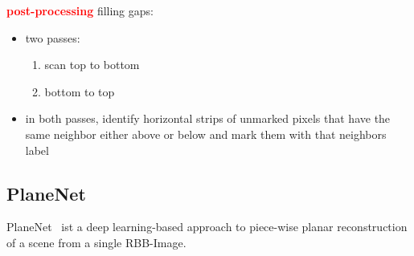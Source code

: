 \documentclass[main.tex]{subfiles}
\begin{document}
\textbf{\textcolor{red}{post-processing}}
filling gaps:
\begin{itemize}
    \item two passes:
    \begin{enumerate}
        \item scan top to bottom 
        \item bottom to top
    \end{enumerate}
    \item in both passes, identify horizontal strips of unmarked pixels that have the same neighbor either above or 
    below and mark them with that neighbors label  
\end{itemize}

\subsection{PlaneNet}
PlaneNet~\cite{Liu_Yang_Ceylan_Yumer_Furukawa_2018} ist a deep learning-based approach to piece-wise planar reconstruction of a scene from a single RBB-Image.
\end{document}
